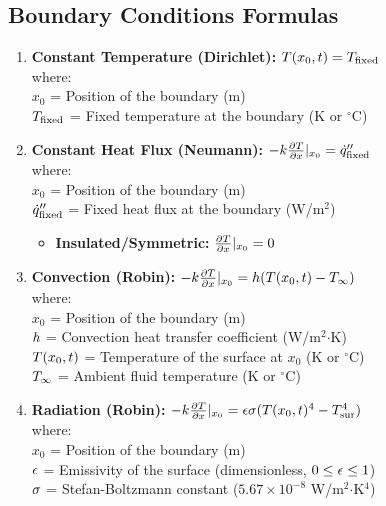 \subsection{Boundary Conditions Formulas}
\begin{enumerate}
    \item \textbf{Constant Temperature (Dirichlet):} $T(x_0, t) = T_{\text{fixed}}$ \\
    \quad where: \\
    \quad $x_0$ = Position of the boundary (m) \\
    \quad $T_{\text{fixed}}$ = Fixed temperature at the boundary (K or $^\circ$C)
    \item \textbf{Constant Heat Flux (Neumann):} $-k \frac{\partial T}{\partial x}|_{x_0} = \dot{q}_{\text{fixed}}''$ \\
    \quad where: \\
    \quad $x_0$ = Position of the boundary (m) \\
    \quad $\dot{q}_{\text{fixed}}''$ = Fixed heat flux at the boundary (W/m$^2$)
        \begin{itemize}
            \item \textbf{Insulated/Symmetric:} $\frac{\partial T}{\partial x}|_{x_0} = 0$
        \end{itemize}
    \item \textbf{Convection (Robin):} $-k \frac{\partial T}{\partial x}|_{x_0} = h (T(x_0, t) - T_{\infty})$ \\
    \quad where: \\
    \quad $x_0$ = Position of the boundary (m) \\
    \quad $h$ = Convection heat transfer coefficient (W/m$^2$$\cdot$K) \\
    \quad $T(x_0, t)$ = Temperature of the surface at $x_0$ (K or $^\circ$C) \\
    \quad $T_{\infty}$ = Ambient fluid temperature (K or $^\circ$C)
    \item \textbf{Radiation (Robin):} $-k \frac{\partial T}{\partial x}|_{x_0} = \epsilon \sigma (T(x_0, t)^4 - T_{\text{sur}}^4)$ \\
    \quad where: \\
    \quad $x_0$ = Position of the boundary (m) \\
    \quad $\epsilon$ = Emissivity of the surface (dimensionless, $0 \le \epsilon \le 1$) \\
    \quad $\sigma$ = Stefan-Boltzmann constant ($5.67 \times 10^{-8}$ W/m$^2$$\cdot$K$^4$) \\

\end{enumerate}
